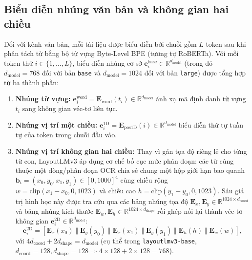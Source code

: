 \subsection{Biểu diễn nhúng văn bản và không gian hai chiều}
Đối với kênh văn bản, mỗi tài liệu được biểu diễn bởi chuỗi gồm $L$ token sau khi phân tách từ bằng bộ từ vựng Byte-Level BPE (tương tự RoBERTa). Với mỗi token thứ $i \in \{1, \dots, L\}$, biểu diễn nhúng cơ sở $\mathbf{e}_i^{\text{base}} \in \mathbb{R}^{d_{\text{model}}}$ (trong đó $d_{\text{model}} = 768$ đối với bản \texttt{base} và $d_{\text{model}} = 1024$ đối với bản \texttt{large}) được tổng hợp từ ba thành phần:
\begin{enumerate}
    \item \textbf{Nhúng từ vựng:} $\mathbf{e}_i^{\text{word}} = \mathbf{E}_{\text{word}}(t_i) \in \mathbb{R}^{d_{\text{model}}}$ ánh xạ mã định danh từ vựng $t_i$ sang không gian véc-tơ liên tục.
    \item \textbf{Nhúng vị trí một chiều:} $\mathbf{e}_i^{\text{1D}} = \mathbf{E}_{\text{pos1D}}(i) \in \mathbb{R}^{d_{\text{model}}}$ biểu diễn thứ tự tuần tự của token trong chuỗi đầu vào.
    \item \textbf{Nhúng vị trí không gian hai chiều:} Thay vì gán tọa độ riêng lẻ cho từng từ con, LayoutLMv3 áp dụng cơ chế bố cục mức phân đoạn: các từ cùng thuộc một dòng/phân đoạn OCR chia sẻ chung một hộp giới hạn bao quanh $\mathbf{b}_i = (x_0, y_0, x_1, y_1) \in [0, 1000]^4$ cùng chiều rộng $w = \text{clip}(x_1 - x_0, 0, 1023)$ và chiều cao $h = \text{clip}(y_1 - y_0, 0, 1023)$. Sáu giá trị hình học này được tra cứu qua các bảng nhúng tọa độ $\mathbf{E}_x, \mathbf{E}_y \in \mathbb{R}^{1024 \times d_{\text{coord}}}$ và bảng nhúng kích thước $\mathbf{E}_w, \mathbf{E}_h \in \mathbb{R}^{1024 \times d_{\text{shape}}}$ rồi ghép nối lại thành véc-tơ không gian $\mathbf{e}_i^{\text{2D}} \in \mathbb{R}^{d_{\text{model}}}$:
    \begin{equation}
        \label{eq:spatial_2d_emb}
        \mathbf{e}_i^{\text{2D}} = \left[ \mathbf{E}_x(x_0) \;\Vert\; \mathbf{E}_y(y_0) \;\Vert\; \mathbf{E}_x(x_1) \;\Vert\; \mathbf{E}_y(y_1) \;\Vert\; \mathbf{E}_h(h) \;\Vert\; \mathbf{E}_w(w) \right],
    \end{equation}
    với $4 d_{\text{coord}} + 2 d_{\text{shape}} = d_{\text{model}}$ (cụ thể trong \texttt{layoutlmv3-base}, $d_{\text{coord}} = 128, d_{\text{shape}} = 128 \Rightarrow 4 \times 128 + 2 \times 128 = 768$).
\end{enumerate}

